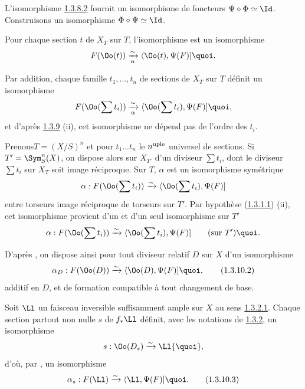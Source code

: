 L'isomorphisme \hyperref[XVIII.par1.3.8.2]{1.3.8.2} fournit un isomorphisme de foncteurs
$\Psi\circ\Phi \simeq \Id$. Construisons un isomorphisme
$\Phi\circ\Psi\simeq \Id$.

Pour chaque section $t$ de $X_{T}$ sur $T$, l'isomorphisme 
est un isomorphisme
$$
F(\Oo(t))\xrightarrow[\alpha]{\sim}\langle \Oo(t),\Psi(F)]{\quoi}.
$$

Par addition, chaque famille $t_{1},\ldots, t_{n}$ de sections de
$X_{T}$ sur $T$ définit un isomorphisme
$$
F(\Oo(\sum t_{i}))\xrightarrow[\alpha]{\sim}\langle \Oo(\sum
t_{i}),\Psi(F)]{\quoi},
$$
et d'après \hyperref[XVIII.subsubsec1.3.9]{1.3.9} (ii), cet isomorphisme ne dépend
pas de l'ordre des $t_{i}$.

Prenons\pageoriginale $T=(X/S)^{n}$ et pour $t_{1}\ldots t_{n}$ le
$n^{\text{\rm uple}}$ universel de sections. Si $T'=\Sym^{n}_{S}(X)$,
on dispose alors sur $X_{T'}$ d'un diviseur $\sum t_{i}$, dont le
diviseur $\sum t_{i}$ sur $X_{T}$ soit image réciproque. Sur $T$,
$\alpha$ est un isomorphisme symétrique
$$
\alpha:F(\Oo(\sum t_{i}))\xrightarrow{\sim} \langle \Oo(\sum
t_{i}),\Psi(F)]
$$
entre torseurs image réciproque de torseurs sur $T'$. Par hypothèse
(\hyperref[XVIII.par1.3.1.1]{1.3.1.1}) (ii), cet isomorphisme provient d'un et d'un seul
isomorphisme sur $T'$
$$
\alpha:F(\Oo(\sum t_{i}))\xrightarrow{\sim} \langle \Oo (\sum
t_{i}),\Psi (F)]\qquad (\text{\rm sur  } T'){\quoi}.
$$

D'après , on dispose ainsi pour tout diviseur relatif $D$ sur
$X$ d'un isomorphisme
\begin{equation*}
\alpha_{D}:F(\Oo(D))\xrightarrow{\sim}
\langle \Oo(D),\Psi(F)]{\quoi},\tag{1.3.10.2}
\end{equation*}%
additif en $D$, et de formation compatible à tout changement de base.

Soit $\Ll$ un faisceau inversible suffisamment ample sur $X$
au sens \hyperref[XVIII.par1.3.2.1]{1.3.2.1}. Chaque section partout non nulle $s$ de
$f_{\ast}\Ll$ définit, avec les notations de \hyperref[XVIII.subsubsec1.3.2]{1.3.2}, un
isomorphisme
$$
s:\Oo(D_{s})\xrightarrow{\sim}\Ll{\quoi},
$$
d'où, par , un isomorphisme
\begin{equation*}
\alpha_{s}:F(\Ll)\xrightarrow{\sim}\langle \Ll,\Psi(F)]{\quoi}.\tag{1.3.10.3}
\end{equation*}

